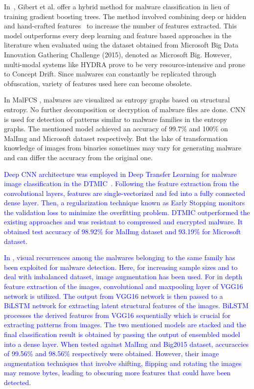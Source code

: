 \documentclass[pdflatex,sn-mathphys]{sn-jnl}%
\begin{document}
In~\cite{25}, Gibert et al. offer a hybrid method for malware classification in lieu of training gradient boosting trees. The method involved combining deep or hidden and hand-crafted features~\cite{25} to increase the number of features extracted. This model outperforms every deep learning and feature based approaches in the literature when evaluated using the dataset obtained from Microsoft Big Data Innovation Gathering Challenge (2015), denoted as Microsoft Big. \color{blue} However, multi-modal systems like HYDRA prove to be very resource-intensive and prone to Concept Drift. Since malwares can constantly be replicated through obfuscation, variety of features used here can become obsolete.   
\color{blue} \par In MalFCS \cite{27}, malwares are visualized as entropy graphs based on structural entropy. No further decomposition or decryption of malware files are done. CNN is used for detection of patterns similar to malware families in the entropy graphs. The mentioned model achieved an accuracy of 99.7\% and 100\% on MalImg and Microsoft dataset respectively. But the lake of transformation knowledge of images from binaries sometimes may vary for generating malware and can differ the accuracy from the original one.
\par
\textcolor{blue}{Deep CNN architecture was employed in Deep Transfer Learning for malware image classification in the DTMIC~\cite{34}. Following the feature extraction from the convolutional layers, features are single-vectorized and fed into a fully connected dense layer. Then, a regularization technique known as Early Stopping monitors the validation loss to minimize the overfitting problem. DTMIC outperformed the existing approaches and was resistant to compressed and encrypted malware. It obtained test accuracy of 98.92\% for MalImg dataset and 93.19\% for Microsoft dataset}. 
\par
 \textcolor{blue}{ In \cite{39}, visual recurrences among the malwares belonging to the same family has been exploited for malware detection. Here, for increasing sample sizes and to deal with imbalanced dataset, image augmentation has been used. For in depth feature extraction of the images, convolutional and maxpooling layer of VGG16 network is utilized. The output from VGG16 network is then passed to a BiLSTM network for extracting latent structural features of the images. BiLSTM processes the derived features from VGG16 sequentially which is crucial for extracting patterns from images. The two mentioned models are stacked and the final classification result is obtained by passing the output of ensembled model into a dense layer.  When tested against MalImg and Big2015 dataset, accuraccies of 99.56\% and 98.56\% respectively were obtained. However, their image augmentation techniques that involve shifting, flipping and rotating the images may remove bytes, leading to obscuring more features that could have been detected.}
\end{document}
